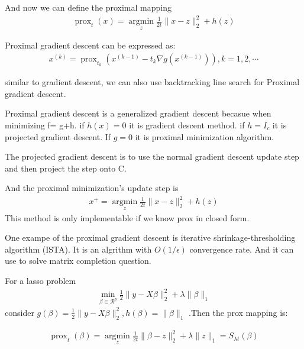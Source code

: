 \documentclass[aps,letterpaper,10pt]{article}
\begin{document}
And now we can define the proximal mapping
\begin{align*}
\operatorname { prox } _ { t } ( x ) = \underset { z } { \operatorname { argmin } } \frac { 1 } { 2 t } \| x - z \| _ { 2 } ^ { 2 } + h ( z )
\end{align*}

Proximal gradient descent can be expressed as:
\begin{align*}
x ^ { ( k ) } = \operatorname { prox } _ { t _ { k } } \left( x ^ { ( k - 1 ) } - t _ { k } \nabla g \left( x ^ { ( k - 1 ) } \right) \right) , k = 1,2 , \cdots
\end{align*}

similar to gradient descent, we can also use backtracking line search for Proximal gradient descent.\vspace{3mm}

Proximal gradient descent is a generalized gradient descent becasue when minimizing f= g+h.
if $h(x)=0$ it is gradient descent method. if $h=I_c$ it is projected gradient descent. If $g=0$  it is proximal minimization algorithm.\vspace{3mm}

The projected gradient descent is to use the normal gradient descent update step and then project the step onto C.\vspace{3mm}

And the proximal minimization's update step is
\begin{align*}
x ^ { + } = \underset { z } { \operatorname { argmin } } \frac { 1 } { 2 t } \| x - z \| _ { 2 } ^ { 2 } + h ( z )
\end{align*}
This method is only implementable if we know prox in closed form.\vspace{3mm}

One exampe of the proximal gradient descent is iterative shrinkage-thresholding algorithm (ISTA). It is an algrithm with $O(1/\epsilon)$ convergence rate. And it can use to solve matrix completion question.\vspace{3mm}

For a lasso problem
\begin{align*}
\min _ { \beta \in \mathcal { R } ^ { p } } \frac { 1 } { 2 } \| y - X \beta \| _ { 2 } ^ { 2 } + \lambda \| \beta \| _ { 1 }
\end{align*}
consider $ g ( \beta ) = \frac { 1 } { 2 } \| y - X \beta \| _ { 2 } ^ { 2 } , h ( \beta ) = \| \beta \| _ { 1 }$ .Then the prox mapping is:

\begin{align*}
\operatorname { prox } _ { t } ( \beta ) = \underset { z } { \operatorname { argmin } } \frac { 1 } { 2 t } \| \beta - z \| _ { 2 } ^ { 2 } + \lambda \| z \| _ { 1 } = S _ { \lambda t } ( \beta )
\end{align*}
\end{document}
